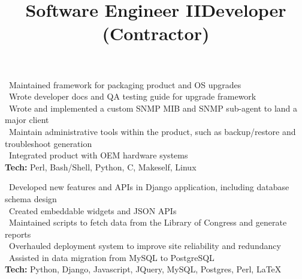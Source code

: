         \title{Software Engineer II}
        \begin{position}
			\textbullet \ Maintained framework for packaging product and OS upgrades \\
			\textbullet \ Wrote developer docs and QA testing guide for upgrade framework\\
            \textbullet \ Wrote and implemented a custom SNMP MIB and SNMP sub-agent to land a major client\\
			\textbullet \ Maintain administrative tools within the product, such as backup/restore and troubleshoot generation\\
			\textbullet \ Integrated product with OEM hardware systems\\
			\textbf{Tech:} Perl, Bash/Shell, Python, C, Makeself, Linux
        \end{position}
        
\pagebreak        
        
        \title{Developer (Contractor)}
        \begin{position}
			\textbullet \ Developed new features and APIs in Django application, including database schema design \\
			\textbullet \ Created embeddable widgets and JSON APIs \\
			\textbullet \ Maintained scripts to fetch data from the Library of Congress and generate reports \\
			\textbullet \ Overhauled deployment system to improve site reliability and redundancy\\
			\textbullet \ Assisted in data migration from MySQL to PostgreSQL\\
			\textbf{Tech:} Python, Django, Javascript, JQuery, MySQL, Postgres, Perl, \LaTeX
        \end{position}
        
